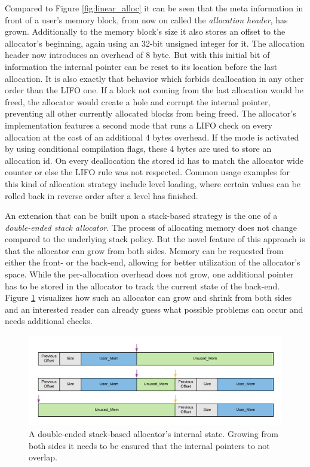 \noindent
Compared to Figure \ref{fig:linear_alloc} it can be seen that the meta information in front of a user's memory block, from now on called the \textit{allocation header}, has grown. Additionally to the memory block's size it also stores an offset to the allocator's beginning, again using an 32-bit unsigned integer for it. The allocation header now introduces an overhead of 8 byte. But with this initial bit of information the internal pointer can be reset to its location before the last allocation. It is also exactly that behavior which forbids deallocation in any other order than the \ac{LIFO} one. If a block not coming from the last allocation would be freed, the allocator would create a hole and corrupt the internal pointer, preventing all other currently allocated blocks from being freed. The allocator's implementation features a second mode that runs a \ac{LIFO} check on every allocation at the cost of an additional 4 bytes overhead. If the mode is activated by using conditional compilation flags, these 4 bytes are used to store an allocation id. On every deallocation the stored id has to match the allocator wide counter or else the \ac{LIFO} rule was not respected. Common usage examples for this kind of allocation strategy include level loading, where certain values can be rolled back in reverse order after a level has finished.

An extension that can be built upon a stack-based strategy is the one of a \textit{double-ended stack allocator}. The process of allocating memory does not change compared to the underlying stack policy. But the novel feature of this approach is that the allocator can grow from both sides. Memory can be requested from either the front- or the back-end, allowing for better utilization of the allocator's space. While the per-allocation overhead does not grow, one additional pointer has to be stored in the allocator to track the current state of the back-end. Figure \ref{fig:double_stack_alloc} visualizes how such an allocator can grow and shrink from both sides and an interested reader can already guess what possible problems can occur and needs additional checks. 

\begin{figure}[h!]
	\centering \includegraphics[width=\linewidth]{PICs/double_stack_alloc.png}
	\caption{A double-ended stack-based allocator's internal state. Growing from both sides it needs to be ensured that the internal pointers to not overlap.}
	\label{fig:double_stack_alloc}
\end{figure}


